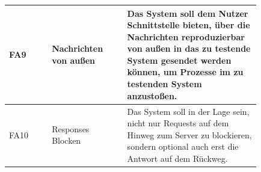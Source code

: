\documentclass[12pt,a4paper]{report}
\begin{document}
\begin{longtable}[H]{|p{}|p{0.3\linewidth}|p{0.53\linewidth}|}
	FA9  & Nachrichten von außen         & Das System soll dem Nutzer Schnittstelle bieten, über die Nachrichten reproduzierbar von außen in das zu testende System gesendet werden können, um Prozesse im zu testenden System anzustoßen.                                                                                                                                                                                                           \\ \hline
	FA10 & Responses Blocken             & Das System soll in der Lage sein, nicht nur Requests auf dem Hinweg zum Server zu blockieren, sondern optional auch erst die Antwort auf dem Rückweg.                                                                                                                                                                                                                                                     \\ \hline
\end{longtable}
\end{document}
